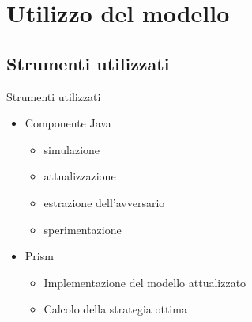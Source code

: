 \documentclass[9pt]{beamer}
\begin{document}
    \section{Utilizzo del modello}
    
        \subsection{Strumenti utilizzati}
            \begin{frame}{Strumenti utilizzati}
              \begin{itemize}
                \item Componente Java
                \begin{itemize}
                  \item simulazione
                  \item attualizzazione
                  \item estrazione dell'avversario
                  \item sperimentazione
                \end{itemize}
                \vspace{0.8cm}
                \item Prism
                \begin{itemize}
                  \item Implementazione del modello attualizzato
                  \item Calcolo della strategia ottima
                \end{itemize}
              \end{itemize}
            \end{frame}
    
\end{document}
